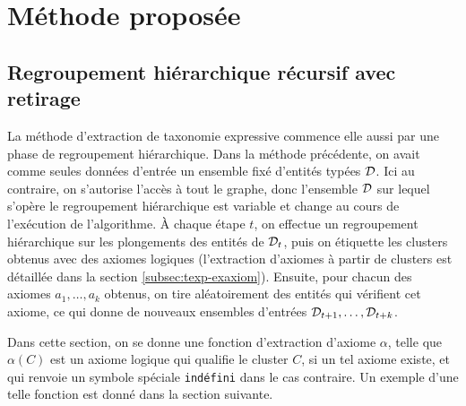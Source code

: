 \section{Méthode proposée}
\subsection{Regroupement hiérarchique récursif avec retirage}

La méthode d'extraction de taxonomie expressive commence elle aussi par une phase de regroupement hiérarchique. Dans la méthode précédente, on avait comme seules données d'entrée un ensemble fixé d'entités typées $\cal{D}$. Ici au contraire, on s'autorise l'accès à tout le graphe, donc l'ensemble $\cal{D}$ sur lequel s'opère le regroupement hiérarchique est variable et change au cours de l'exécution de l'algorithme. À chaque étape $t$, on effectue un regroupement hiérarchique sur les plongements des entités de $\cal{D}_t$, puis on étiquette les clusters obtenus avec des axiomes logiques (l'extraction d'axiomes à partir de clusters est détaillée dans la section \ref{subsec:texp-exaxiom}). Ensuite, pour chacun des axiomes $a_1, \ldots, a_k$ obtenus, on tire aléatoirement des entités qui vérifient cet axiome, ce qui donne de nouveaux ensembles d'entrées $\cal{D}_{t+1}, \ldots, \cal{D}_{t+k}$.

Dans cette section, on se donne une fonction d'extraction d'axiome $\alpha$, telle que $\alpha(C)$ est un axiome logique qui qualifie le cluster $C$, si un tel axiome existe, et qui renvoie un symbole spéciale \texttt{indéfini} dans le cas contraire. Un exemple d'une telle fonction est donné dans la section suivante. 

